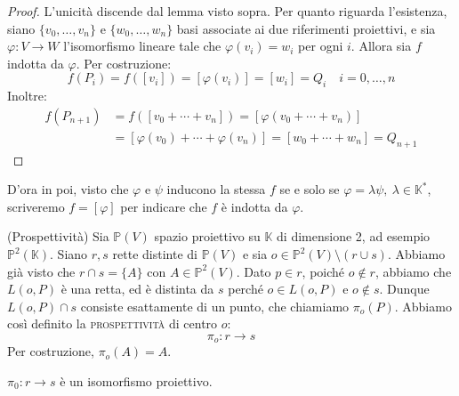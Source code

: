 \begin{proof}
L'unicità discende dal lemma visto sopra. Per quanto riguarda l'esistenza, siano $\{v_0,\dots,v_n\}$ e $\{w_0,\dots,w_n\}$ basi associate ai due riferimenti proiettivi, e sia $\varphi : V\rightarrow W$ l'isomorfismo lineare tale che $\varphi (v_i)=w_i$ per ogni $i$. Allora sia $f$ indotta da $\varphi$. Per costruzione:
$$f(P_i)=f([v_i])=[\varphi (v_i)]=[w_i]=Q_i \quad i=0,\dots,n$$
Inoltre:
\begin{align*}
f(P_{n+1})&=f([v_0+\cdots+v_n])=[\varphi (v_0+\cdots+v_n)]\\
&=[\varphi (v_0)+\cdots+\varphi (v_n)]=[w_0+\cdots+w_n]=Q_{n+1}
\end{align*}
\end{proof}

D'ora in poi, visto che $\varphi$ e $\psi$ inducono la stessa $f$ se e solo se $\varphi =\lambda \psi,\ \lambda \in \mathbb{K}^*$, scriveremo $f=[\varphi]$ per indicare che $f$ è indotta da $\varphi$.

\begin{ex}
(Prospettività) Sia $\mathbb{P}(V)$ spazio proiettivo su $\mathbb{K}$ di dimensione 2, ad esempio $\mathbb{P}^2(\mathbb{K})$. Siano $r,s$ rette distinte di $\mathbb{P}(V)$ e sia $o \in \mathbb{P}^2(V) \setminus (r \cup s)$. Abbiamo già visto che $r \cap s =\{A\}$ con $A \in \mathbb{P}^2(V)$. Dato $p \in r$, poiché $o \notin r$, abbiamo che $L(o,P)$ è una retta, ed è distinta da $s$ perché $o \in L(o,P)$ e $o \notin s$. Dunque $L(o,P) \cap s$ consiste esattamente di un punto, che chiamiamo $\pi _o(P)$. Abbiamo così definito la \textsc{prospettività} di centro $o$:
$$\pi_o:r \rightarrow s$$
Per costruzione, $\pi_o(A)=A$.
\end{ex}

\begin{thm}
$\pi_0:r \rightarrow s$ è un isomorfismo proiettivo.
\end{thm}

